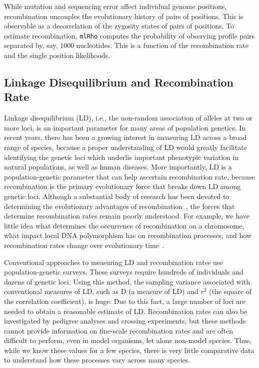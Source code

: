 \documentclass{sig-alternate}
\newcommand{\ty}{\texttt}
\begin{document}
While mutation and sequencing error affect individual genome
positions, recombination uncouples the evolutionary history of pairs
of positions. This is observable as a decorrelation of the zygosity
states of pairs of positions. To estimate recombination, \ty{mlRho}
computes the probability of observing profile pairs separated by, say,
1000 nucleotides. This is a function of the recombination rate and the
single position likelihoods.


\subsection{Linkage Disequilibrium and Recombination Rate}\label{sec:LD}

Linkage disequilibrium (LD), i.e., the non-random association of alleles at two or more loci, is an important parameter for many areas of population genetics.  In recent years, there has been a growing interest in measuring LD across a broad range of species, because a proper understanding of LD would greatly facilitate identifying the genetic loci which underlie important phenotypic variation in natural populations, as well as human diseases. More importantly, LD is a population-genetic parameter that can help ascertain recombination rate, because recombination is the primary evolutionary force that breaks down LD among genetic loci. Although a substantial body of research has been devoted to determining the evolutionary advantages of recombination~\cite{resolving-paradox}, the forces that determine recombination rates remain poorly understood. For example, we have little idea what determines the occurrence of recombination on a chromosome, what impact local DNA polymorphism has on recombination processes, and how recombination rates change over evolutionary time~\cite{stumpf}. 

Conventional approaches to measuring LD and recombination rates use population-genetic surveys. These surveys require hundreds of individuals and dozens of genetic loci. Using this method, the sampling variance associated with conventional measures of LD, such as D (a measure of LD) and $r^2$ (the square of the correlation coefficient), is huge. Due to this fact, a large number of loci are needed to obtain a reasonable estimate of LD.  Recombination rates can also be investigated by pedigree analyses and crossing experiments, but these methods cannot provide information on fine-scale recombination rates and are often difficult to perform, even in model organisms, let alone non-model species. Thus, while we know these values for a few species, there is very little comparative data to understand how these processes vary across many species.
\end{document}
